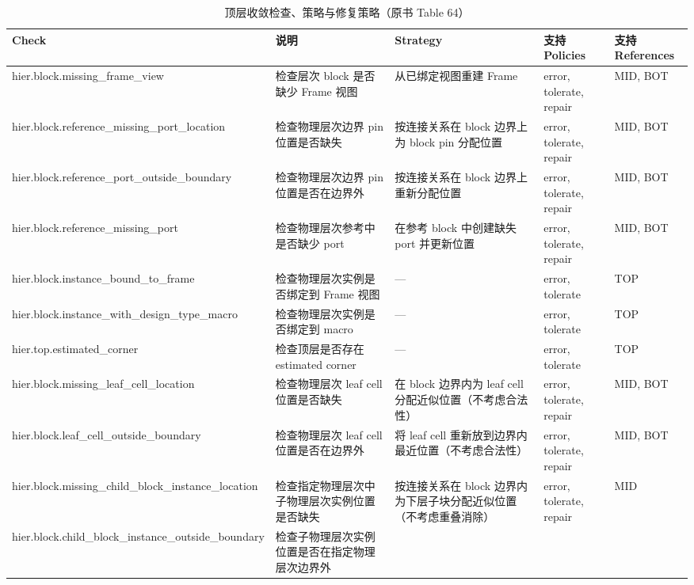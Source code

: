 \begin{table}[htbp]
\centering
\caption{顶层收敛检查、策略与修复策略（原书 Table 64）}
\label{tab:hier-tlc-checks}
\small
\begin{tabularx}{\textwidth}{@{}>{\ttfamily\raggedright\arraybackslash}p{} >{\raggedright\arraybackslash}X >{\raggedright\arraybackslash}p{} >{\raggedright\arraybackslash}p{} >{\raggedright\arraybackslash}p{}@{}}
\toprule
Check & 说明 & Strategy & 支持 Policies & 支持 References \\
\midrule
hier.block.missing\_frame\_view
  & 检查层次 block 是否缺少 Frame 视图
  & 从已绑定视图重建 Frame
  & error, tolerate, repair & MID, BOT \\
hier.block.reference\_missing\_port\_location
  & 检查物理层次边界 pin 位置是否缺失
  & 按连接关系在 block 边界上为 block pin 分配位置
  & error, tolerate, repair & MID, BOT \\
hier.block.reference\_port\_outside\_boundary
  & 检查物理层次边界 pin 位置是否在边界外
  & 按连接关系在 block 边界上重新分配位置
  & error, tolerate, repair & MID, BOT \\
hier.block.reference\_missing\_port
  & 检查物理层次参考中是否缺少 port
  & 在参考 block 中创建缺失 port 并更新位置
  & error, tolerate, repair & MID, BOT \\
hier.block.instance\_bound\_to\_frame
  & 检查物理层次实例是否绑定到 Frame 视图
  & --- & error, tolerate & TOP \\
hier.block.instance\_with\_design\_type\_macro
  & 检查物理层次实例是否绑定到 macro
  & --- & error, tolerate & TOP \\
hier.top.estimated\_corner
  & 检查顶层是否存在 estimated corner
  & --- & error, tolerate & TOP \\
hier.block.missing\_leaf\_cell\_location
  & 检查物理层次 leaf cell 位置是否缺失
  & 在 block 边界内为 leaf cell 分配近似位置（不考虑合法性）
  & error, tolerate, repair & MID, BOT \\
hier.block.leaf\_cell\_outside\_boundary
  & 检查物理层次 leaf cell 位置是否在边界外
  & 将 leaf cell 重新放到边界内最近位置（不考虑合法性）
  & error, tolerate, repair & MID, BOT \\
hier.block.missing\_child\_block\_instance\_location
  & 检查指定物理层次中子物理层次实例位置是否缺失
  & 按连接关系在 block 边界内为下层子块分配近似位置（不考虑重叠消除）
  & error, tolerate, repair & MID \\
hier.block.child\_block\_instance\_outside\_boundary
  & 检查子物理层次实例位置是否在指定物理层次边界外

\end{tabularx}
\end{table}
